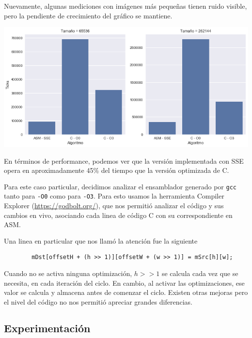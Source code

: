 Nuevamente, algunas mediciones con imágenes más pequeñas tienen ruido visible, pero la pendiente de crecimiento del gráfico se mantiene.

\begin{center}
	\includegraphics[scale=0.5]{img/fourCombine_CvsASMvsO3_bars.png}
\end{center}

En términos de performance, podemos ver que la versión implementada con SSE opera en aproximadamente 45\% del tiempo que la versión optimizada de C.

Para este caso particular, decidimos analizar el ensamblador generado por \texttt{gcc} tanto para \texttt{-O0} como para \texttt{-O3}. Para esto usamos la herramienta Compiler Explorer (\url{https://godbolt.org/}), que nos permitió analizar el código y sus cambios en vivo, asociando cada linea de código C con su correspondiente en ASM.

Una linea en particular que nos llamó la atención fue la siguiente

\begin{lstlisting}
		mDst[offsetH + (h >> 1)][offsetW + (w >> 1)] = mSrc[h][w];
\end{lstlisting}

Cuando no se activa ninguna optimización, $h >> 1$ se calcula cada vez que se necesita, en cada iteración del ciclo. En cambio, al activar las optimizaciones, ese valor se calcula y almacena antes de comenzar el ciclo. Existen otras mejoras pero el nivel del código no nos permitió apreciar grandes diferencias.

\subsection{Experimentación}


